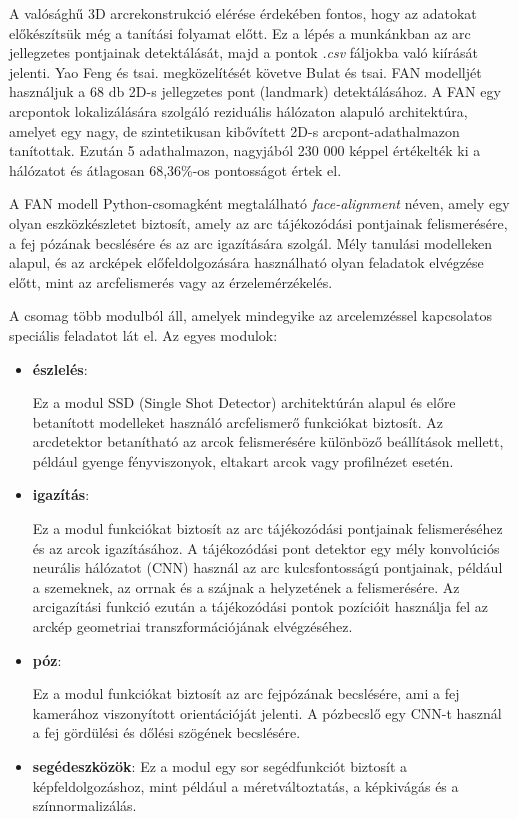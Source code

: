 \documentclass[12pt,a4]{article}
\begin{document}
            A valósághű 3D arcrekonstrukció elérése érdekében fontos, hogy az adatokat előkészítsük még a tanítási folyamat előtt. Ez a lépés a munkánkban az arc jellegzetes pontjainak detektálását, majd a pontok \textit{.csv} fáljokba való kiírását jelenti. Yao Feng és tsai. \cite{deca} megközelítését követve \cite{bulat}Bulat és tsai. FAN modelljét használjuk a 68 db 2D-s jellegzetes pont (landmark) detektálásához. A FAN egy arcpontok lokalizálására szolgáló reziduális hálózaton alapuló architektúra, amelyet  egy nagy, de szintetikusan kibővített 2D-s arcpont-adathalmazon tanítottak. Ezután 5 adathalmazon, nagyjából 230 000 képpel értékelték ki a hálózatot és átlagosan 68,36\%-os pontosságot értek el.

            A FAN modell Python-csomagként megtalálható \textit{face-alignment} néven, amely egy olyan eszközkészletet biztosít, amely az arc tájékozódási pontjainak felismerésére, a fej pózának becslésére és az arc igazítására szolgál. 
            Mély tanulási modelleken alapul, és az arcképek előfeldolgozására használható olyan feladatok elvégzése előtt, mint az arcfelismerés vagy az érzelemérzékelés.
            
            A csomag több modulból áll, amelyek mindegyike az arcelemzéssel kapcsolatos speciális feladatot lát el. Az egyes modulok:

            \begin{itemize}
                \item \textbf{észlelés}: 
                
                Ez a modul SSD (Single Shot Detector) architektúrán alapul és előre betanított modelleket használó arcfelismerő funkciókat biztosít. Az arcdetektor betanítható az arcok felismerésére különböző beállítások mellett, például gyenge fényviszonyok, eltakart arcok vagy profilnézet esetén.
        
                \item \textbf{igazítás}: 
                
                Ez a modul funkciókat biztosít az arc tájékozódási pontjainak felismeréséhez és az arcok igazításához.
        		A tájékozódási pont detektor egy mély konvolúciós neurális hálózatot (CNN) használ az arc kulcsfontosságú pontjainak, például a szemeknek, az orrnak és a szájnak a helyzetének a felismerésére. 
        		Az arcigazítási funkció ezután a tájékozódási pontok pozícióit használja fel az arckép geometriai transzformációjának elvégzéséhez.
        
        
                \item \textbf{póz}: 
                
                Ez a modul funkciókat biztosít az arc fejpózának becslésére, ami a fej kamerához viszonyított orientációját jelenti. A pózbecslő egy CNN-t használ a fej gördülési és dőlési szögének becslésére.
                \item \textbf{segédeszközök}: Ez a modul egy sor segédfunkciót biztosít a képfeldolgozáshoz, mint például a méretváltoztatás, a képkivágás és a színnormalizálás.
        
            \end{itemize}
\end{document}
